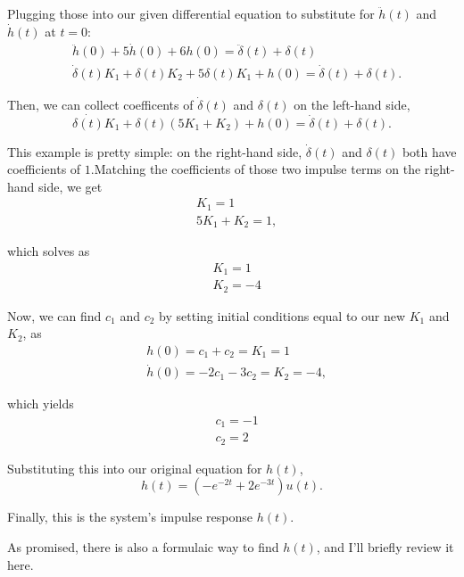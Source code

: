 \documentclass{article}
\begin{document}
Plugging those into our given differential equation to substitute for \(\ddot{h}(t)\) and \(\dot{h}(t)\) at \(t=0\):
\begin{align}
	&\ddot{h}(0) + 5\dot{h}(0) + 6h(0) = \ddot{\delta}(t) + \delta(t)\\
	&\dot{\delta}(t)K_1 + \delta(t)K_2 + 5\delta(t)K_1 + h(0) = \dot{\delta}(t) + \delta(t).
\end{align}

Then, we can collect coefficents of \(\dot{\delta}(t)\) and \(\delta(t)\) on the left-hand side, 
\[
	\dot{\delta(t)}K_1 + \delta(t)(5K_1 + K_2) + h(0) = \dot{\delta}(t) + \delta(t).
\]

This example is pretty simple: on the right-hand side, \(\dot{\delta}(t)\) and \(\delta(t)\) both have coefficients of \(1\).Matching the coefficients of those two impulse terms on the right-hand side, we get
\begin{align*}
	& K_1 = 1 \\
	& 5K_1 + K_2 = 1,
\end{align*}

which solves as 
\begin{align*}
	&K_1 = 1 \\
	&K_2 = -4
\end{align*}

Now, we can find \(c_1\) and \(c_2\) by setting initial conditions equal to our new \(K_1\) and \(K_2\), as 
\begin{align*}
	&h(0) = c_1 + c_2 = K_1 = 1 \\
	&\dot{h}(0) = -2c_1 - 3c_2 = K_2 = -4,
\end{align*}

which yields 
\begin{align*}
	&c_1 = -1\\
	&c_2 = 2
\end{align*}

Substituting this into our original equation for \(h(t)\),
\[
	h(t) = (-e^{-2t} + 2e^{-3t})u(t).
\]

Finally, this is the system's impulse response \(h(t)\).

As promised, there is also a formulaic way to find \(h(t)\), and I'll briefly review it here. 
\end{document}
